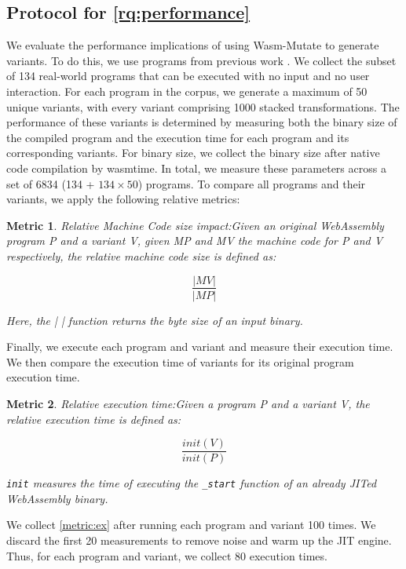 \documentclass[a4paper,fleqn]{cas-dc}
\newcommand{\tool}{{\sc Wasm-Mutate}\xspace}
\newcommand{\Wasm}{WebAssembly\xspace}
\newtheorem{metric}{Metric}
\newenvironment{revision1}{\color{blue}}{}
\begin{document}
\begin{revision1}

\subsection{Protocol for \ref{rq:performance}}
We evaluate the performance implications of using \tool to generate variants. 
To do this, we use programs from previous work \cite{hilbig2021empirical}. 
We collect the subset of 134 real-world programs that can be executed with no input and no user interaction.
For each program in the corpus, we generate a maximum of 50 unique variants, with every variant comprising 1000 stacked transformations. 
The performance of these variants is determined by measuring both the binary size of the compiled program and the execution time for each program and its corresponding variants. 
For binary size, we collect the binary size after native code compilation by wasmtime.
In total, we measure these parameters across a set of 6834 (134 + $134\times50$) programs. 
To compare all programs and their variants, we apply the following relative metrics:


\begin{metric}{Relative Machine Code size impact:}\label{metric:mcize} Given an original \Wasm program P and a variant V, given MP and MV the machine code for P and V respectively, the relative machine code size is defined as:

$$
    \frac{|MV|}{|MP|}
$$

Here, the \textit{| |} function returns the byte size of an input binary.     
\end{metric}

Finally, we execute each program and variant and measure their execution time. 
We then compare the execution time of variants for its original program execution time.

\begin{metric}{Relative execution time:}\label{metric:ex}
Given a program P and a variant V, the relative execution time is defined as:

$$
    \frac{init(V)}{init(P)}
$$

\texttt{init} measures the time of executing the \texttt{_start} function of an already JITed \Wasm binary.
\end{metric}

We collect \autoref{metric:ex} after running each program and variant 100 times.
We discard the first 20 measurements to remove noise and warm up the JIT engine.
Thus, for each program and variant, we collect 80 execution times.
  
\end{revision1}
\end{document}
